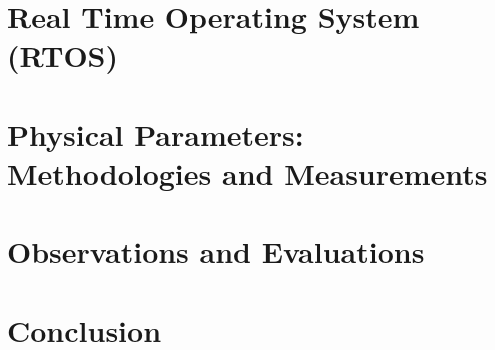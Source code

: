 \documentclass{article}
\begin{document}
\section{Real Time Operating System (RTOS)}

\clearpage
\section{Physical Parameters: Methodologies and Measurements}

\clearpage
\section{Observations and Evaluations}

\clearpage
\section{Conclusion}

\clearpage


\end{document}
